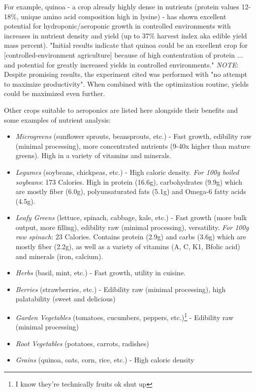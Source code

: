 \documentclass{report}
\begin{document}
For example, quinoa - a crop already highly dense in nutrients (protein values 12-18\%, unique amino acid composition high in lysine) - has shown excellent potential for hydroponic/aeroponic growth in controlled environments %
with increases in nutrient density and yield (up to 37\% harvest index aka edible yield mass percent). "Initial results indicate that quinoa could be an excellent crop for [controlled-environment agriculture] because of high contentration of protein ... and potential for greatly increased yields in controlled environments." \textit{NOTE}: Despite promising results, the experiment cited was performed with "no attempt to maximize productivity". When combined with the optimization routine, yields could be maximized even further.

Other crops suitable to aeroponics are listed here alongside their benefits and some examples of nutrient analysis:
\begin{itemize}
    \item \textit{Microgreens} (sunflower sprouts, beansprouts, etc.) - Fast growth, edibility raw (minimal processing), more concentrated nutrients (9-40x higher than mature greens). High in a variety of vitamins and minerals. 
    \item \textit{Legumes} (soybeans, chickpeas, etc.) - High caloric density. \textit{For 100g boiled soybeans}: 173 Calories. High in protein (16.6g), carbohydrates (9.9g) which are mostly fiber (6.0g), polyunsaturated fats (5.1g) and Omega-6 fatty acids (4.5g). 
    \item \textit{Leafy Greens} (lettuce, spinach, cabbage, kale, etc.) - Fast growth (more bulk output, more filling), edibility raw (minimal processing), versatility. \textit{For 100g raw spinach}: 23 Calories. Contains protein (2.9g) and carbs (3.6g) which are mostly fiber (2.2g), as well as a variety of vitamins (A, C, K1, Bfolic acid) and minerals (iron, calcium). 
    \item \textit{Herbs} (basil, mint, etc.) - Fast growth, utility in cuisine.
    \item \textit{Berries} (strawberries, etc.) - Edibility raw (minimal processing), high palatability (sweet and delicious)
    \item \textit{Garden Vegetables} (tomatoes, cucumbers, peppers, etc.)\footnote{I know they're technically fruits ok shut up} - Edibility raw (minimal processing)
    \item \textit{Root Vegetables} (potatoes, carrots, radishes)
    \item \textit{Grains} (quinoa, oats, corn, rice, etc.) - High caloric density
\end{itemize}
\end{document}
